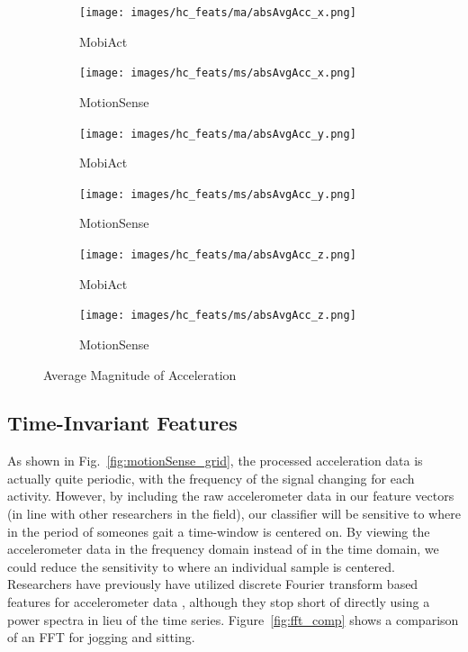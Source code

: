 \begin{figure}[H]
\begin{subfigure}{.5\textwidth}
  \texttt{[image: images/hc\_feats/ma/absAvgAcc\_x.png]}
    \caption{MobiAct}
    \label{fig:avg_abs_acc_x_ma}
\end{subfigure}
\begin{subfigure}{.5\textwidth}
    \texttt{[image: images/hc\_feats/ms/absAvgAcc\_x.png]}
    \caption{MotionSense}
    \label{fig:avg_abs_acc_x_ms}
\end{subfigure}
\begin{subfigure}{.5\textwidth}
  \texttt{[image: images/hc\_feats/ma/absAvgAcc\_y.png]}
    \caption{MobiAct}
    \label{fig:avg_abs_acc_y_ma}
\end{subfigure}
\begin{subfigure}{.5\textwidth}
    \texttt{[image: images/hc\_feats/ms/absAvgAcc\_y.png]}
    \caption{MotionSense}
    \label{fig:avg_abs_acc_y_ms}
\end{subfigure}
\begin{subfigure}{.5\textwidth}
  \texttt{[image: images/hc\_feats/ma/absAvgAcc\_z.png]}
    \caption{MobiAct}
    \label{fig:avg_abs_acc_z_ma}
\end{subfigure}
\begin{subfigure}{.5\textwidth}
    \texttt{[image: images/hc\_feats/ms/absAvgAcc\_z.png]}
    \caption{MotionSense}
    \label{fig:avg_abs_acc_z_ms}
\end{subfigure}
\caption{Average Magnitude of Acceleration}
\label{fig:avg_abs_acc}
\end{figure}

		
\subsection{Time-Invariant Features}
\label{sub:time_invar}
	 
As shown in Fig.~\ref{fig:motionSense_grid}, the processed acceleration data is actually quite periodic, with the frequency of the signal changing for each activity. However, by including the raw accelerometer data in our feature vectors (in line with other researchers in the field), our classifier will be sensitive to where in the period of someones gait a time-window is centered on. By viewing the accelerometer data in the frequency domain instead of in the time domain, we could reduce the sensitivity to where an individual sample is centered. Researchers have previously have utilized discrete Fourier transform based features for accelerometer data \cite{ferrari2019hand}, although they stop short of directly using a power spectra in lieu of the time series. Figure~\ref{fig:fft_comp} shows a comparison of an FFT for jogging and sitting.


